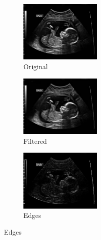 \documentclass[a4paper,10pt,twocolumn]{article}
\begin{document}
\begin{center}
	\begin{figure}[!htb]
		\begin{subfigure}[a!]{4cm}
			\includegraphics[width=4cm]{image/im3/im_3}
			\caption{Original}
		\end{subfigure}
		\begin{subfigure}[b!]{4cm}
			\includegraphics[width=4cm]{image/im3/im_3_noise}
			\caption{Filtered}
		\end{subfigure}
		\begin{subfigure}[c!]{4cm}
			\includegraphics[width=4cm]{image/im3/im_3_edge}
			\caption{Edges}
		\end{subfigure}
		

\end{figure}
\end{center}
\end{document}
